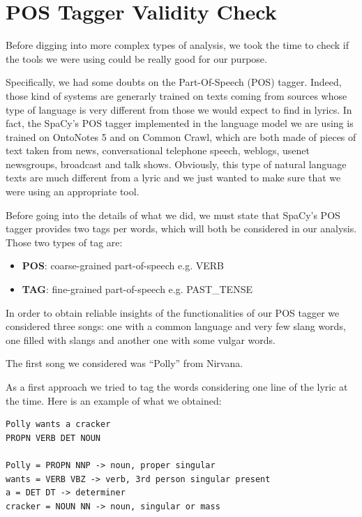 \section{POS Tagger Validity Check} 

Before digging into more complex types of analysis, we took the time to check if
the tools we were using could be really good for our purpose. 

Specifically, we had some doubts on the Part-Of-Speech (POS) tagger. Indeed, those kind of systems are generarly 
trained on texts coming from sources whose type of language is very different from those
we would expect to find in lyrics. In fact, the SpaCy's POS tagger implemented in the language
model we are using is trained on OntoNotes 5\cite{ontonotes5} and on Common Crawl\cite{common-crawl},
which are both made of pieces of text taken from news, conversational telephone speech, weblogs, 
usenet newsgroups, broadcast and talk shows. Obviously, this type of natural language texts are 
much different from a lyric and we just wanted to make sure that we were using an appropriate tool.

Before going into the details of what we did, we must state that SpaCy's POS tagger provides two tags per words, which
will both be considered in our analysis. Those two types of tag are:

\begin{itemize}
\item \textbf{POS}: coarse-grained part-of-speech e.g. VERB
\item \textbf{TAG}: fine-grained part-of-speech e.g. PAST\_TENSE
\end{itemize}

In order to obtain reliable insights of the functionalities of our POS tagger we considered three songs:
one with a common language and very few slang words, one filled with slangs and another one with some
vulgar words.

The first song we considered was ``Polly'' from Nirvana.

As a first approach we tried to tag the words considering one line of the lyric at the time. Here is an example of
what we obtained:

\begin{lstlisting}
Polly wants a cracker
PROPN VERB DET NOUN 

Polly = PROPN NNP -> noun, proper singular
wants = VERB VBZ -> verb, 3rd person singular present
a = DET DT -> determiner
cracker = NOUN NN -> noun, singular or mass
\end{lstlisting}

